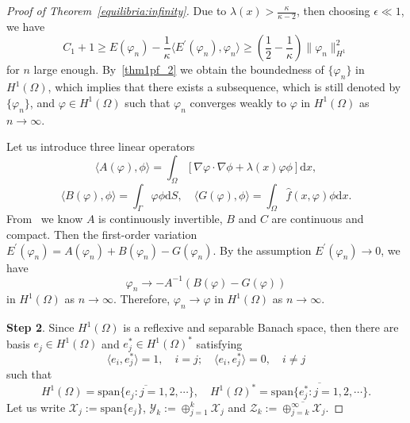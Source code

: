 \documentclass{elsarticle}
\begin{document}
\begin{proof}[Proof of Theorem~\ref{equilibria:infinity}]
Due to $\lambda(x) > \frac{\kappa}{\kappa-2}$, then choosing $\epsilon \ll 1$, we have
\begin{equation}\label{thm1pf_2}
	C_1 +1 \geqslant E(\varphi_n) - \frac{1}{\kappa}\langle E^{\prime}(\varphi_n), \varphi_n \rangle\geqslant \left( \frac{1}{2} - \frac{1}{\kappa}\right)\|\varphi_n\|^2_{H^1}
\end{equation}
for $n$ large enough. By~\eqref{thm1pf_2} we obtain the boundedness of $\{\varphi_n\}$ in $H^{1}(\Omega)$, which implies that there exists a subsequence, which is still denoted by $\{\varphi_n\}$, and $\varphi\in H^1(\Omega)$ such that $\varphi_n$ converges weakly to $\varphi$ in $H^1(\Omega)$ as $n\rightarrow\infty$.

Let us introduce three linear operators
\[
	\langle A(\varphi), \phi \rangle = \int_{\Omega}\left[ \nabla\varphi \cdot\nabla\phi + \lambda(x)\varphi\phi \right]\mathrm{d}x,
\]
\[
	\langle B(\varphi), \phi \rangle = \int_{\Gamma}\varphi\phi \mathrm{d}S , \quad \langle G(\varphi), \phi \rangle = \int_{\Omega}\hat{f}(x, \varphi)\phi \mathrm{d}x.
\]
From~\cite{martinez2003weak} we know $A$ is continuously invertible, $B$ and $C$ are continuous and compact.
Then the first-order variation $E^{\prime}(\varphi_n) =  A(\varphi_n) + B(\varphi_n) - G(\varphi_n)$.
By the assumption $E^{\prime}(\varphi_n) \rightarrow 0$, we have
\[
	\varphi_n\rightarrow -A^{-1}\left( B(\varphi) - G(\varphi)\right)
\]
in $H^1(\Omega)$ as $n\rightarrow\infty$. Therefore, $\varphi_n\rightarrow \varphi$ in $H^{1}(\Omega)$ as $n\rightarrow\infty$. 

\textbf{Step 2}. Since $H^1(\Omega)$ is a reflexive and separable Banach space, then there are basis $e_j\in H^1(\Omega)$ and $e^{\ast}_j\in H^1(\Omega)^{\ast}$ satisfying
\[
	\langle e_i, e_j^{\ast} \rangle = 1,\quad i=j; \quad \langle e_i, e_j^{\ast} \rangle = 0,\quad i\neq j
\]
such that
\[
	H^1(\Omega) = \overline{\mathrm{span}\{e_j: j=1, 2, \cdots\}},\quad H^1(\Omega)^{\ast} = \overline{\mathrm{span}\{e_j^{\ast}: j=1, 2, \cdots\}}.
\]
Let us write $\mathcal{X}_j:=\mathrm{span}\{e_j\}$,   $\mathcal{Y}_k:= \oplus_{j=1}^{k}\mathcal{X}_j$ and $\mathcal{Z}_k:= \overline{\oplus_{j=k}^{\infty}\mathcal{X}_j}$.


\end{proof}
\end{document}
